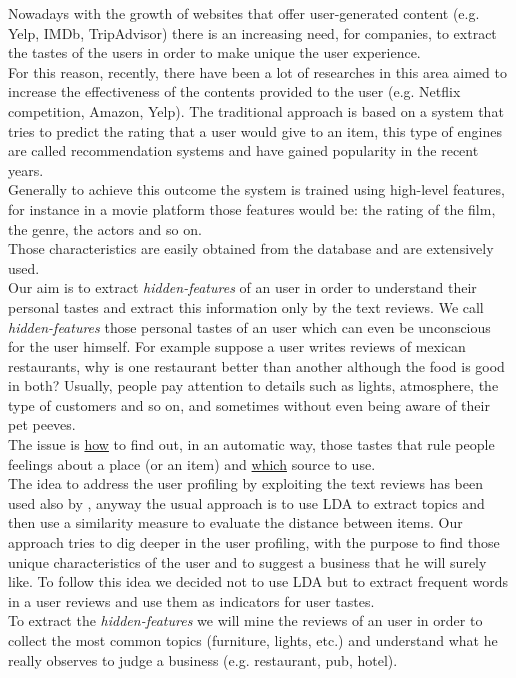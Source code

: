 \documentclass[11pt]{article}
\begin{document}
Nowadays with the growth of websites that offer user-generated content (e.g. Yelp, IMDb, TripAdvisor) there is an increasing need, for companies, to extract the tastes of the users in order to make unique the user experience.\\
For this reason, recently, there have been a lot of researches in this area aimed to increase the effectiveness of the contents provided to the user (e.g. Netflix competition\cite{netflix}, Amazon, Yelp\cite{altroYelp}).
The traditional approach is based on a system that tries to predict the rating that a user would give to an item, this type of engines are called recommendation systems and have gained popularity in the recent years.\\
Generally to achieve this outcome the system is trained using high-level features, for instance in a movie platform those features would be: the rating of the film, the genre, the actors and so on.\\
Those characteristics are easily obtained from the database and are extensively used.\\
Our aim is to extract \textit{hidden-features} of an user in order to understand their personal tastes and extract this information only by the text reviews.
We call \textit{hidden-features} those personal tastes of an user which can even be unconscious for the user himself. 
For example suppose a user writes reviews of mexican restaurants, why is one restaurant better than another although the food is good in both? Usually, people pay attention to details such as lights, atmosphere, the type of customers and so on, and sometimes without even being aware of their pet peeves.\\
The issue is \underline{how} to find out, in an automatic way, those tastes that rule people feelings about a place (or an item) and \underline{which} source to use.\\
The idea to address the user profiling by exploiting the text reviews has been used also by \cite{rev}, anyway the usual approach is to use LDA to extract topics and then use a similarity measure to evaluate the distance between items. Our approach tries to dig deeper in the user profiling, with the purpose to find those unique characteristics of the user and to suggest a business that he will surely like. To follow this idea we decided not to use LDA but to extract frequent words in a  user reviews and use them as indicators for user tastes.\\
To extract the \textit{hidden-features} we will mine the reviews of an user in order to collect the most common topics (furniture, lights, etc.) and  understand what he really observes to judge a business (e.g. restaurant, pub, hotel).
\end{document}
